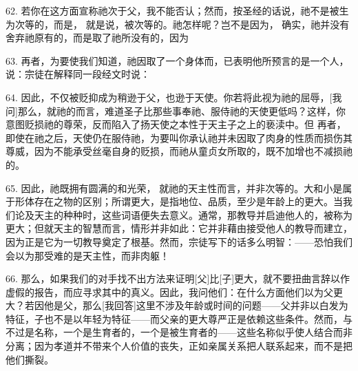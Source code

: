 62. 若你在这方面宣称祂次于父，我不能否认；然而，按圣经的话说，祂不是被生为次等的，而是， 就是说，被次等的。祂怎样呢？岂不是因为， 确实，祂并没有舍弃祂原有的，而是取了祂所没有的，因为\par

63. 再者，为要使我们知道，祂因取了一个身体而，已表明他所预言的是一个人，说：宗徒在解释同一段经文时说：\par

64. 因此，不仅被贬抑成为稍逊于父，也逊于天使。你若将此视为祂的屈辱，[我问]那么，就祂的而言，难道圣子比那些事奉祂、服侍祂的天使更低吗？这样，你意图贬损祂的尊荣，反而陷入了扬天使之本性于天主子之上的亵渎中。但 再者，即使在祂之后，天使仍在服侍祂，为要叫你承认祂并未因取了肉身的性质而损伤其尊威，因为不能承受丝毫自身的贬损，而祂从童贞女所取的，既不加增也不减损祂的。\par

65. 因此，祂既拥有圆满的和光荣， 就祂的天主性而言，并非次等的。大和小是属于形体存在之物的区别；所谓更大，是指地位、品质，至少是年龄上的更大。当我们论及天主的种种时，这些词语便失去意义。通常，那教导并启迪他人的，被称为更大；但就天主的智慧而言，情形并非如此：它并非藉由接受他人的教导而建立，因为正是它为一切教导奠定了根基。然而，宗徒写下的话多么明智：——恐怕我们会以为那受难的是天主性，而非肉躯！\par

66. 那么，如果我们的对手找不出方法来证明[父]比[子]更大，就不要扭曲言辞以作虚假的报告，而应寻求其中的真义。因此，我问他们：在什么方面他们以为父更大？若因他是父，那么[我回答]这里不涉及年龄或时间的问题——父并非以白发为特征，子也不是以年轻为特征——而父亲的更大尊严正是依赖这些条件。然而，与不过是名称，一个是生育者的，一个是被生育者的——这些名称似乎使人结合而非分离；因为孝道并不带来个人价值的丧失，正如亲属关系把人联系起来，而不是把他们撕裂。\par

